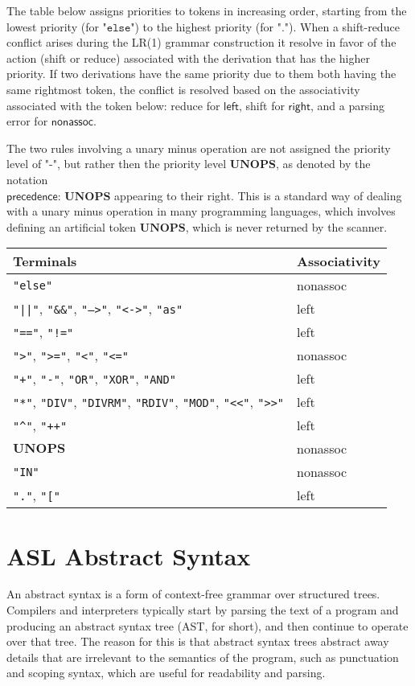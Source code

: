 \documentclass{book}
\newcommand\terminal[1]{\mathtt{\mathbf{#1}}}
\newcommand\verbatimterminal[2]{\texttt{"}\texttt{#2}\texttt{"}} %
\newcommand\Tand[0]{\verbatimterminal{AND}{AND}}
\newcommand\Tas[0]{\verbatimterminal{AS}{as}}
\newcommand\Tband[0]{\verbatimterminal{BAND}{\&\&}}
\newcommand\Tbeq[0]{\verbatimterminal{BEQ}{<->}}
\newcommand\Tbor[0]{\verbatimterminal{BOR}{||}}
\newcommand\Tconcat[0]{\verbatimterminal{CONCAT}{++}}
\newcommand\Tdiv[0]{\verbatimterminal{DIV}{DIV}}
\newcommand\Tdivrm[0]{\verbatimterminal{DIVRM}{DIVRM}}
\newcommand\Tdot[0]{\verbatimterminal{DOT}{.}}
\newcommand\Telse[0]{\verbatimterminal{ELSE}{else}}
\newcommand\Txor[0]{\verbatimterminal{XOR}{XOR}}
\newcommand\Teqop[0]{\verbatimterminal{EQ\_OP}{==}}
\newcommand\Tgeq[0]{\verbatimterminal{GEQ}{>=}}
\newcommand\Tgt[0]{\verbatimterminal{GT}{>}}
\newcommand\Timpl[0]{\verbatimterminal{IMPL}{-->}}
\newcommand\Tin[0]{\verbatimterminal{IN}{IN}}
\newcommand\Tlbracket[0]{\verbatimterminal{LBRACKET}{[}}
\newcommand\Tleq[0]{\verbatimterminal{LEQ}{<=}}
\newcommand\Tlt[0]{\verbatimterminal{LT}{<}}
\newcommand\Tminus[0]{\verbatimterminal{MINUS}{-}}
\newcommand\Tmod[0]{\verbatimterminal{MOD}{MOD}}
\newcommand\Tmul[0]{\verbatimterminal{MUL}{*}}
\newcommand\Tneq[0]{\verbatimterminal{NEQ}{!=}}
\newcommand\Tor[0]{\verbatimterminal{OR}{OR}}
\newcommand\Tplus[0]{\verbatimterminal{PLUS}{+}}
\newcommand\Tpow[0]{\verbatimterminal{POW}{\^{}}}
\newcommand\Trdiv[0]{\verbatimterminal{RDIV}{RDIV}}
\newcommand\Tshl[0]{\verbatimterminal{SHL}{<<}}
\newcommand\Tshr[0]{\verbatimterminal{SHR}{>>}}
\newcommand\Tunops[0]{\terminal{UNOPS}}
\newcommand\precedence[1]{\textsf{precedence: }#1}
\newcommand\nonassoc[0]{\textsf{nonassoc}}
\newcommand\leftassoc[0]{\textsf{left}}
\newcommand\rightassoc[0]{\textsf{right}}
\begin{document}
The table below assigns priorities to tokens in increasing order, starting from the lowest priority (for $\Telse$)
to the highest priority (for $\Tdot$).
When a shift-reduce conflict arises during the LR(1) grammar construction
it resolve in favor of the action (shift or reduce) associated with the derivation that has the higher priority.
If two derivations have the same priority due to them both having the same rightmost token,
the conflict is resolved based on the associativity associated with the token below:
reduce for $\leftassoc$, shift for $\rightassoc$, and a parsing error for $\nonassoc$.

The two rules involving a unary minus operation are not assigned the priority level of $\Tminus$,
but rather then the priority level $\Tunops$, as denoted by the notation \\
$\precedence{\Tunops}$
appearing to their right. This is a standard way of dealing with a unary minus operation
in many programming languages, which involves defining an artificial token $\Tunops$,
which is never returned by the scanner.

\begin{center}
\begin{tabular}{ll}
\textbf{Terminals} & \textbf{Associativity}\\
\hline
\Telse & \nonassoc\\
\Tbor, \Tband, \Timpl, \Tbeq, \Tas & \leftassoc\\
\Teqop, \Tneq & \leftassoc\\
\Tgt, \Tgeq, \Tlt, \Tleq & \nonassoc\\
\Tplus, \Tminus, \Tor, \Txor, \Tand & \leftassoc\\
\Tmul, \Tdiv, \Tdivrm, \Trdiv, \Tmod, \Tshl, \Tshr & \leftassoc\\
\Tpow, \Tconcat & \leftassoc\\
$\Tunops$ & \nonassoc\\
\Tin & \nonassoc\\
\Tdot, \Tlbracket & \leftassoc
\end{tabular}
\end{center}

\chapter{ASL Abstract Syntax \label{chap:ASLAbstractSyntax}}
An abstract syntax is a form of context-free grammar over structured trees.
Compilers and interpreters typically start by parsing the text of a program and producing an abstract syntax tree (AST, for short),
and then continue to operate over that tree.
%
The reason for this is that abstract syntax trees abstract away details that are irrelevant to the semantics of the program,
such as punctuation and scoping syntax, which are useful for readability and parsing.
\end{document}
